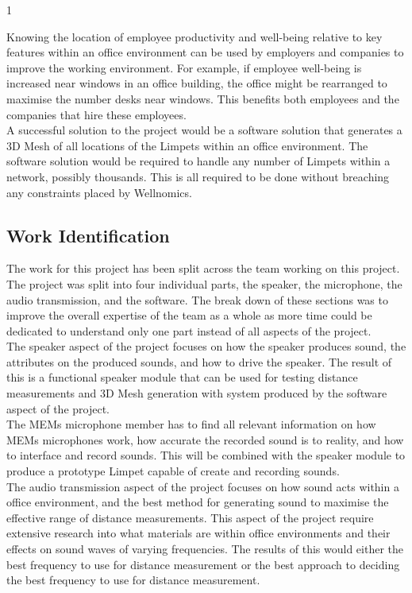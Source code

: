 1\documentclass{article}
\begin{document}
Knowing the location of employee productivity and well-being relative to key features within an office environment can be used by employers and companies to improve the working environment. For example, if employee well-being is increased near windows in an office building, the office might be rearranged to maximise the number desks near windows. This benefits both employees and the companies that hire these employees.\\

A successful solution to the project would be a software solution that generates a 3D Mesh of all locations of the Limpets within an office environment. The software solution would be required to handle any number of Limpets within a network, possibly thousands. This is all required to be done without breaching any constraints placed by Wellnomics.

\subsection{Work Identification}
The work for this project has been split across the team working on this project. The project was split into four individual parts, the speaker, the microphone, the audio transmission, and the software. The break down of these sections was to improve the overall expertise of the team as a whole as more time could be dedicated to understand only one part instead of all aspects of the project.\\

The speaker aspect of the project focuses on how the speaker produces sound, the attributes on the produced sounds, and how to drive the speaker. The result of this is a functional speaker module that can be used for testing distance measurements and 3D Mesh generation with system produced by the software aspect of the project.\\

The MEMs microphone member has to find all relevant information on how MEMs microphones work, how accurate the recorded sound is to reality, and how to interface and record sounds. This will be combined with the speaker module to produce a prototype Limpet capable of create and recording sounds.\\

The audio transmission aspect of the project focuses on how sound acts within a office environment, and the best method for generating sound to maximise the effective range of distance measurements. This aspect of the project require extensive research into what materials are within office environments and their effects on sound waves of varying frequencies. The results of this would either the best frequency to use for distance measurement or the best approach to deciding the best frequency to use for distance measurement.\\
\end{document}
